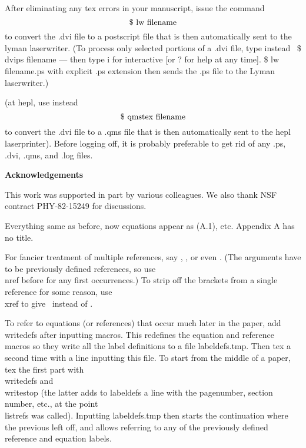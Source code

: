 After eliminating any tex errors in your manuscript, issue the command
%
$$\hbox{\$ lw filename}$$
%
to convert the .dvi file to a postscript file that is then automatically
sent to the lyman laserwriter.
(To process only selected portions of a .dvi file,
type instead \ \$ dvips filename --- then type i for interactive [or
? for help at any time].
\$ lw filename.ps with explicit .ps extension then sends the .ps
file to the Lyman laserwriter.)


\subseclab\shepl %
(at hepl, use instead
%
$$\hbox{\$ qmstex filename}$$
%
to convert the .dvi file to a .qms file that is then automatically
sent to the hepl laserprinter).  Before logging off, it is
probably preferable to get rid of any .ps, .dvi, .qms, and .log files.


\bigbreak\bigskip\bigskip\centerline{{\bf Acknowledgements}}\nobreak
This work was supported in part by various colleagues.  We also thank
NSF contract PHY-82-15249 for discussions.


Everything same as before, now equations appear as (A.1), etc.
Appendix A has no title.


For fancier treatment of multiple references, say ,
, or even . (The arguments
have to be previously defined references, so use \\nref before for any
first occurrences.) To strip off the brackets from a single reference for
some reason, use \\xref to give \xref\rIi\ instead of \rIi.

To refer to equations (or references) that occur much later in the
paper, add \\writedefs after inputting macros.
This redefines the equation and reference macros so they write all the
label definitions to a file labeldefs.tmp. Then tex a second time with a
line inputting this file.  To start from the middle of a paper, tex
the first part with \\writedefs and \\writestop %
(the latter adds to labeldefs a line with the pagenumber, section number,
etc., at the point \\listrefs was called).  Inputting labeldefs.tmp then
starts the continuation where the previous left off, and allows referring
to any of the previously defined reference and equation labels.

